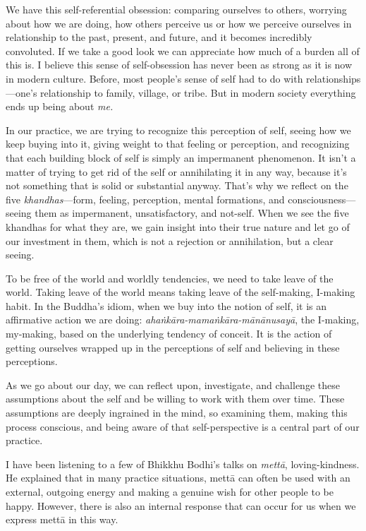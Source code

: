 We have this self-referential obsession: comparing ourselves to others, 
worrying about how we are doing, how others perceive us or how we 
perceive ourselves in relationship to the past, present, and future, 
and it becomes incredibly convoluted. If we take a good look we can 
appreciate how much of a burden all of this is. I believe this sense of 
self-obsession has never been as strong as it is now in modern culture. 
Before, most people's sense of self had to do with 
relationships---one's relationship to family, village, or tribe. But in 
modern society everything ends up being about \emph{me.}

In our practice, we are trying to recognize this perception of self, 
seeing how we keep buying into it, giving weight to that feeling or 
perception, and recognizing that each building block of self is simply 
an impermanent phenomenon. It isn't a matter of trying to get rid of 
the self or annihilating it in any way, because it's not something that 
is solid or substantial anyway. That's why we reflect on the five 
\emph{khandhas}---form, feeling, perception, mental formations, and 
consciousness---seeing them as impermanent, unsatisfactory, and 
not-self. When we see the five khandhas for what they are, we gain 
insight into their true nature and let go of our investment in them, 
which is not a rejection or annihilation, but a clear seeing.

To be free of the world and worldly tendencies, we need to take leave 
of the world. Taking leave of the world means taking leave of the 
self-making, I-making habit. In the Buddha's idiom, when we buy into 
the notion of self, it is an affirmative action we are doing: 
\emph{ahaṅkāra-mamaṅkāra-mānānusayā}, the I-making, my-making, 
based on the underlying tendency of conceit. It is the action of 
getting ourselves wrapped up in the perceptions of self and believing 
in these perceptions.

As we go about our day, we can reflect upon, investigate, and challenge 
these assumptions about the self and be willing to work with them over 
time. These assumptions are deeply ingrained in the mind, so examining 
them, making this process conscious, and being aware of that 
self-perspective is a central part of our practice.


I have been listening to a few of Bhikkhu Bodhi's talks on 
\emph{mettā}, loving-kindness. He explained that in many practice 
situations, mettā can often be used with an external, outgoing energy 
and making a genuine wish for other people to be happy. However, there 
is also an internal response that can occur for us when we express 
mettā in this way.


